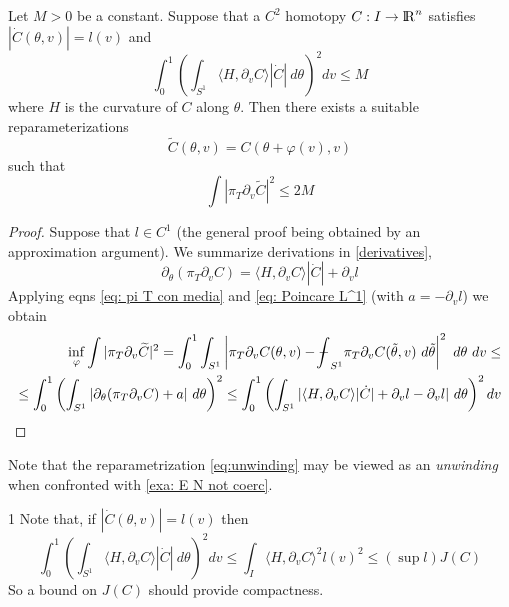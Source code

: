 \documentclass[twoside,a4paper,english]{article}
\def\derpar#1{\partial_{#1}}
\newcommand\lint{{\protect\mathrm{-\hskip-1.1em \int}}}
\begin{document}
\begin{Proposition}\label{prop: bound H1}
  Let $M>0$ be a constant.
  Suppose that a  $C^2$ homotopy  \hbox{$C:I\to{\protect\mathrm{l\hskip-0.15em R}}^n$} satisfies  
  $|\dot C(\theta,v)|=l(v)$ and
  \begin{equation}
    \int_0^1 \left(  \int_{S^1}
      \langle H, \derpar v C \rangle |\dot C|~d\theta\right)^2dv \le M
    \label{eq: bound on H Cv}
  \end{equation}
  where $H$ is the curvature of $C$ along $\theta$.
  Then there exists a suitable reparameterizations   
  \begin{equation}
    \widetilde C(\theta,v)= C(\theta+ \varphi(v),v)\label{eq:unwinding}    
  \end{equation}
  such that
  \[ \int |\pi_T \derpar v \widetilde C|^2 \le 2M \]

  \begin{proof}    
    Suppose that $l\in C^1$ (the general proof being obtained by an
    approximation argument).
    We summarize  derivations in \ref{derivatives},
    \[\derpar\theta (\pi_T \derpar v C)=  
    \langle H,\derpar v C \rangle |\dot C|+
    \derpar v l\]
    Applying eqns   \eqref{eq: pi T con media}   and \eqref{eq: Poincare L^1}
    (with $a=-\derpar v l$) we obtain
    \begin{eqnarray*}
      \inf_\varphi \int |\pi_T \derpar v \widetilde C|^2=
      \int_0^1 \int_{S^1}\left | \pi_T \derpar v  C (\theta,v)
        - \lint_{S^1} \pi_T \derpar v C (\tilde \theta,v)~d\tilde\theta
      \right|^2~d\theta~dv
      \le \\ \le
      \int_0^1 \left(  \int_{S^1}
        |\derpar\theta (\pi_T \derpar v C)+a| ~d\theta  \right)^2
       \le
      \int_0^1 \left(  \int_{S^1}
        |\langle H, \derpar v C\rangle |\dot C| 
         +\derpar v l-\derpar v l | ~d\theta\right)^2dv
    \end{eqnarray*}

  \end{proof}
\end{Proposition}
Note that the reparametrization \eqref{eq:unwinding} may be viewed as an 
\emph{unwinding} when confronted with \ref{exa: E N not coerc}.

\begin{Remark}\label{rem: bound on J compactness}1
  Note that, if $|\dot C(\theta,v)|=l(v)$ then
  \[   \int_0^1 \left(  \int_{S^1}
    \langle H, \derpar v C \rangle |\dot C|~d\theta\right)^2 dv \le   
  \int_I \langle H, \derpar v C \rangle^2 l(v)^2\le   (\sup l) J(C)  \]
  So a bound on $J(C)$ should provide compactness.
\end{Remark}
\end{document}
